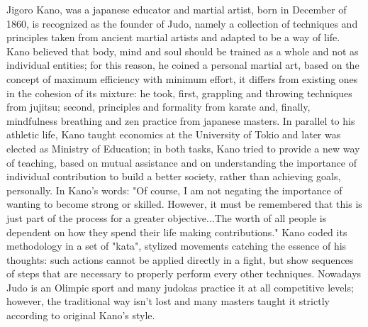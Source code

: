 \documentclass[a4paper,dottedtoc,headinclude,footinclude]{report} %
\theoremstyle{plain}
\begin{document}
    Jigoro Kano, was a japanese educator and martial artist, born 
    in December of 1860, is recognized as the founder of Judo,
    namely a collection of techniques and principles taken from
    ancient martial artists and adapted to be a way of life.
    Kano believed that body, mind and soul should be trained as
    a whole and not as individual entities; for this reason, 
    he coined a personal martial art, based on the concept of 
    maximum efficiency with minimum effort, 
    it differs from existing ones in the cohesion of its mixture: 
    he took, first, grappling and throwing techniques from jujitsu;
    second, principles and formality from karate and,
    finally, mindfulness breathing and zen practice
    from japanese masters. In parallel to his athletic life, Kano
    taught economics at the University of Tokio and later was elected 
    as Ministry of Education; in both tasks, Kano tried to provide
    a new way of teaching, based on mutual assistance and on
    understanding the importance of individual contribution to 
    build a better society, rather than achieving goals, personally.
    In Kano's words: "Of course, I am not negating the importance of 
    wanting to become strong or skilled. However, it must be 
    remembered that this is just part of the process for a greater 
    objective...The worth of all people is dependent on how they spend 
    their life making contributions."
    Kano coded its methodology in a set of "kata", stylized movements
    catching the essence of his thoughts: such actions cannot be
    applied directly in a fight, but show sequences of steps that are necessary
    to properly perform every other techniques.
    Nowadays Judo is an Olimpic sport and many judokas practice it at all
    competitive levels; however, the traditional way isn't lost and
    many masters taught it strictly according to original Kano's style.

    


    \iffalse
    \nocite{*}
    \addtocontents{toc}{\protect\vspace{\beforebibskip}}
    \addcontentsline{toc}{section}{\refname}    
    
    
    \fi
\end{document}
